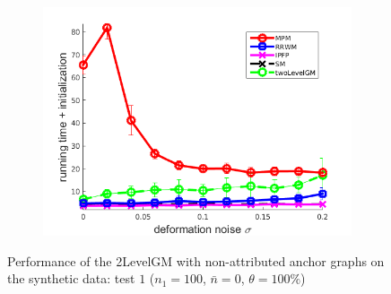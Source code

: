 \begin{figure}[h]
\begin{subfigure}[b]{0.3\textwidth}
	\end{subfigure} 
	\begin{subfigure}[b]{0.3\textwidth}
		\centering
		\includegraphics[scale=0.25]{"chapter3/fig/SyntheticTest/no_descr/Results_v4.3.3/Test2/time_summary_avg10t"} 
	\end{subfigure} 
	\caption[Performance of the 2LevelGM with non-attributed anchor graphs on the synthetic data (test $1$)]{Performance of the 2LevelGM with non-attributed anchor graphs on the synthetic data: test $1$ ($n_1=100$, $\bar{n}=0$, $\theta=100\%$)}
	\label{fig:synTest1_ver433}
\end{figure}
\vspace{-20pt}
